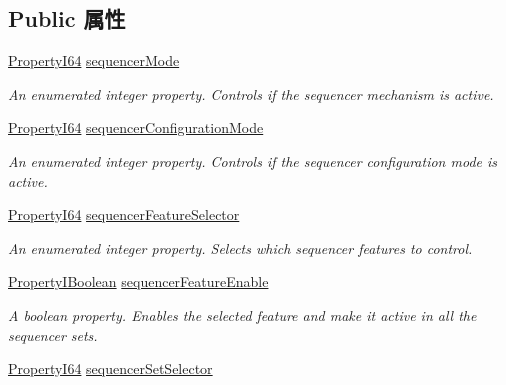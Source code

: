 \subsection*{Public 属性}
\begin{DoxyCompactItemize}
\item 
\hyperlink{group___common_interface_ga81749b2696755513663492664a18a893}{Property\+I64} \hyperlink{classmv_i_m_p_a_c_t_1_1acquire_1_1_gen_i_cam_1_1_sequencer_control_a9988c1f6abaf32ace7220c2139bdd5c7}{sequencer\+Mode}
\begin{DoxyCompactList}\small\item\em An enumerated integer property. Controls if the sequencer mechanism is active. \end{DoxyCompactList}\item 
\hyperlink{group___common_interface_ga81749b2696755513663492664a18a893}{Property\+I64} \hyperlink{classmv_i_m_p_a_c_t_1_1acquire_1_1_gen_i_cam_1_1_sequencer_control_acd4fe83b0353ecdcd9c8c5b17db09570}{sequencer\+Configuration\+Mode}
\begin{DoxyCompactList}\small\item\em An enumerated integer property. Controls if the sequencer configuration mode is active. \end{DoxyCompactList}\item 
\hyperlink{group___common_interface_ga81749b2696755513663492664a18a893}{Property\+I64} \hyperlink{classmv_i_m_p_a_c_t_1_1acquire_1_1_gen_i_cam_1_1_sequencer_control_aa8c6d750c19279e6c4c629b767e60899}{sequencer\+Feature\+Selector}
\begin{DoxyCompactList}\small\item\em An enumerated integer property. Selects which sequencer features to control. \end{DoxyCompactList}\item 
\hyperlink{group___common_interface_ga44f9437e24b21b6c93da9039ec6786aa}{Property\+I\+Boolean} \hyperlink{classmv_i_m_p_a_c_t_1_1acquire_1_1_gen_i_cam_1_1_sequencer_control_a9f42d8001d6d139d3603d0fe02225a71}{sequencer\+Feature\+Enable}
\begin{DoxyCompactList}\small\item\em A boolean property. Enables the selected feature and make it active in all the sequencer sets. \end{DoxyCompactList}\item 
\hyperlink{group___common_interface_ga81749b2696755513663492664a18a893}{Property\+I64} \hyperlink{classmv_i_m_p_a_c_t_1_1acquire_1_1_gen_i_cam_1_1_sequencer_control_a110c5e05d7b5f9e990b0ed2b1b8e423b}{sequencer\+Set\+Selector}

\end{DoxyCompactItemize}

